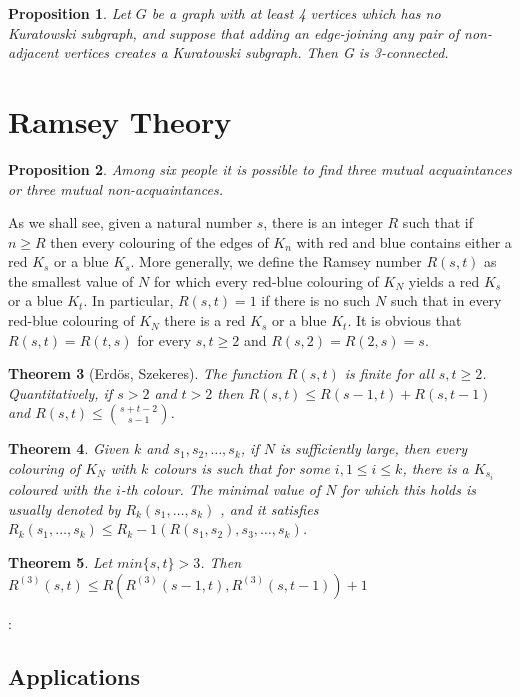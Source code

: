 \documentclass[11pt, fleqn, a4paper, landscape]{article}
\theoremstyle{plain} %
\newtheorem{thm}{Theorem}
\newtheorem{pro}[thm]{Proposition}
\theoremstyle{remark} %
\theoremstyle{definition} %
\begin{document}
\begin{multicols}{3}
\begin{pro}
Let $G$ be a graph with at least 4 vertices which has no Kuratowski subgraph, and suppose that adding an edge-joining any pair of non-adjacent vertices creates a Kuratowski subgraph.
Then G is 3-connected.
\end{pro}

\section{Ramsey Theory}

\begin{pro}
Among six people it is possible to find three mutual acquaintances or three mutual non-acquaintances.
\end{pro}

As we shall see, given a natural number $s$, there is an integer $R$ such that if $n \ge R$ then every colouring of the edges of $K_n$ with red and blue contains either a red $K_s$ or a blue $K_s$. More generally, we define the Ramsey number $R(s, t)$ as the smallest value of $N$ for which every red-blue colouring of $K_N$ yields a red $K_s$ or a blue $K_t$. In particular, $R(s, t) = 1$ if there is no such $N$ such that in every red-blue
colouring of $K_N$ there is a red $K_s$ or a blue $K_t$. It is obvious that
$ R(s, t) = R(t, s)$ for every $s, t \ge 2$ and $R(s, 2) = R(2, s) = s$. 

\begin{thm}[Erdös, Szekeres]
The function $R(s, t)$ is finite for all $s, t \ge 2$. Quantitatively, if $s > 2 $ and $t > 2$ then $R(s, t)\le R(s - 1, t) + R(s, t - 1)$ and $R(s, t) \le \binom{s+t-2}{s-1}$.
\end{thm}

\begin{thm}
Given $k$ and $s_1, s_2, \dots , s_k$, if $N$ is sufficiently large, then every colouring of $K_N$ with $k$ colours is such that for some $i, 1 \le i \le k$, there is a $K_{s_i}$ coloured with the $i$-th colour. The
minimal value of $N$ for which this holds is usually denoted by $R_k(s_1, \dots , s_k)$ , and it satisfies $R_k(s_1, \dots , s_k)\le R_k-1(R(s_1, s_2), s_3, \dots , s_k)$.
\end{thm}

\begin{thm}
Let $min\{s, t\} > 3$. Then
$R^{(3)}(s, t) \le R(R^{(3)}(s - 1, t),R^{(3)}(s, t - 1)) + 1$
\end{thm}:

\subsection{Applications}


\end{multicols}
\end{document}
